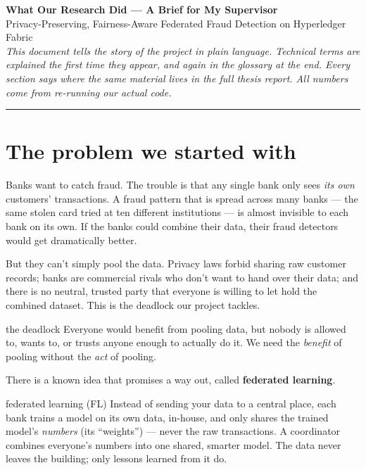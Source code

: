 \documentclass[11pt]{article}
\begin{document}
\pagestyle{empty}

\begin{center}
  {\LARGE\bfseries\color{accent} What Our Research Did --- A Brief for My Supervisor}\\[5pt]
  {\large Privacy-Preserving, Fairness-Aware Federated Fraud Detection on Hyperledger Fabric}\\[7pt]
  {\small\itshape This document tells the story of the project in plain language. Technical terms are
  explained the first time they appear, and again in the glossary at the end. Every section says where
  the same material lives in the full thesis report. All numbers come from re-running our actual code.}
\end{center}
\vspace{0.3em}
\hrule
\vspace{0.7em}

\section{The problem we started with}

Banks want to catch fraud. The trouble is that any single bank only sees \emph{its own} customers'
transactions. A fraud pattern that is spread across many banks --- the same stolen card tried at ten
different institutions --- is almost invisible to each bank on its own. If the banks could combine
their data, their fraud detectors would get dramatically better.

But they can't simply pool the data. Privacy laws forbid sharing raw customer records; banks are
commercial rivals who don't want to hand over their data; and there is no neutral, trusted party that
everyone is willing to let hold the combined dataset. This is the deadlock our project tackles.

\begin{plain}{the deadlock}
Everyone would benefit from pooling data, but nobody is allowed to, wants to, or trusts anyone enough
to actually do it. We need the \emph{benefit} of pooling without the \emph{act} of pooling.
\end{plain}

There is a known idea that promises a way out, called \textbf{federated learning}.

\begin{plain}{federated learning (FL)}
Instead of sending your data to a central place, each bank trains a model on its own data, in-house,
and only shares the trained model's \emph{numbers} (its ``weights'') --- never the raw transactions.
A coordinator combines everyone's numbers into one shared, smarter model. The data never leaves the
building; only lessons learned from it do.
\end{plain}
\end{document}
